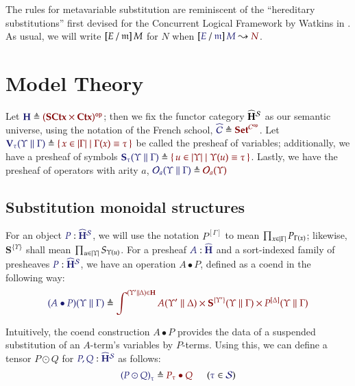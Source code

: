 The rules for metavariable substitution are reminiscent of the ``hereditary
substitutions'' first devised for the Concurrent Logical Framework by Watkins
in \cite{watkins:2004}.
%
As usual, we will write $\left[E\, /\, \mathfrak{m}\right]M$ for $N$ when
$\IsSubst{E}{\MV{m}}{M}{N}$.

\section{Model Theory}

\newcommand\SymPsh{\mathbf{S}}
\newcommand\VarPsh{\mathbf{V}}

Let $\Define{\HypCat}{\OpCat{(\SCtx\times\Ctx)}}$; then we fix the functor
category $\widehat{\mathbf{H}}^{\mathcal{S}}$ as our semantic universe, using the
notation of the French school,
$\Define{\widehat{\mathcal{C}}}{\Sets^{\OpCat{\mathcal{C}}}}$.
%
Let $\Define{\VarPsh_\tau(\Upsilon\parallel\Gamma)}{\MkSet{x\in\Dom\Gamma\mid
    \Gamma(x)\equiv\tau}}$ be called the presheaf of variables; additionally, we have
a presheaf of symbols
$\Define{\SymPsh_\tau(\Upsilon\parallel\Gamma)}{\MkSet{u\in\Dom\Upsilon\mid
    \Upsilon(u)\equiv\tau}}$. Lastly, we have the presheaf of operators with arity
$a$,
$\Define{\Operators_a(\Upsilon\parallel\Gamma)}{\Operators_a(\Upsilon)}$

\subsection{Substitution monoidal structures}

For an object $\Of{P}{\widehat{\HypCat}^\Sorts}$, we will use the notation
$P^{[\Gamma]}$ to mean $\prod_{x\in\left\vert\Gamma\right\vert}P_{\Gamma(x)}$; likewise,
$\SymPsh^{\{\Upsilon\}}$ shall mean $\prod_{u\in\left\vert\Upsilon\right\vert}S_{\Upsilon(u)}$. For a
presheaf $\Of{A}{\widehat{\HypCat}}$ and a sort-indexed family of presheaves
$\Of{P}{\widehat{\HypCat}^\Sorts}$, we have an operation $A\bullet P$, defined
as a coend in the following way:
\[
  \Define{(A\bullet P)(\Upsilon\parallel\Gamma)}{
    \int^{(\Upsilon'\parallel\Delta)\in\HypCat}
      A(\Upsilon'\parallel\Delta)
      \times \SymPsh^{\{\Upsilon'\}}(\Upsilon\parallel\Gamma)
      \times P^{[\Delta]}(\Upsilon\parallel\Gamma)
  }
\]

Intuitively, the coend construction $A\bullet P$ provides the data of a
suspended substitution of an $A$-term's variables by $P$-terms.
%
Using this, we can define a tensor $P\odot Q$ for
$\Of{P,Q}{\widehat{\HypCat}^\Sorts}$ as follows:
\[
  \HypJ{
    \Define{{(P\odot Q)}_{\tau}}{
      P_\tau\bullet Q
    }
\quad
  }{
    \Member{\tau}{\Sorts}
  }
\]

